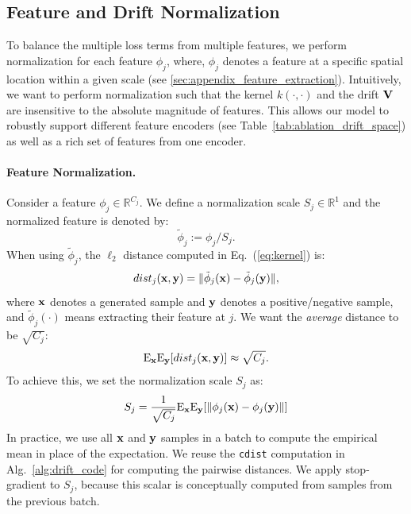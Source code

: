 \subsection{Feature and Drift Normalization}
\label{sec:appendix_feature_and_loss_normalization}

To balance the multiple loss terms from multiple features, we perform normalization for each feature $\phi_j$, where, $\phi_j$ denotes a feature at a specific spatial location within a given scale (see \ref{sec:appendix_feature_extraction}). 
Intuitively, we want to perform normalization such that the kernel $k(\cdot, \cdot)$ and the drift $\mathbf{V}$ are insensitive to the absolute magnitude of features.
This allows our model to robustly support different feature encoders (see Table~\ref{tab:ablation_drift_space}) as well as a rich set of features from one encoder.

\paragraph{Feature Normalization.} Consider a feature $\phi_j \in \mathbb{R}^{C_j}$. We define a normalization scale $S_j \in \mathbb{R}^{1}$ and the normalized feature is denoted by:
\begin{equation}
\tilde{\phi}_j := {\phi}_j / S_j.
\end{equation}
When using $\tilde{\phi}_j$, the $\ell_2$ distance computed in Eq.~(\ref{eq:kernel}) is:
\begin{equation}
dist_j(\mathbf{x}, \mathbf{y}) = \|\tilde{\phi}_j(\mathbf{x}) - \tilde{\phi}_j(\mathbf{y})\|,
\end{equation}
where $\mathbf{x}$ denotes a generated sample and $\mathbf{y}$ denotes a positive/negative sample, and $\tilde{\phi}_j(\cdot)$ means extracting their feature at $j$. We want the \textit{average} distance to be $\sqrt{C_j}$:
\begin{equation}
\mathrm{E}_{\mathbf{x}} \mathrm{E}_{\mathbf{y}} [ dist_j(\mathbf{x}, \mathbf{y})] \approx \sqrt{C_j}.
\end{equation}
To achieve this, we set the normalization scale $S_j$ as:
\begin{equation}
S_j = \frac{1}{\sqrt{C_j}} \mathrm{E}_{\mathbf{x}} \mathrm{E}_{\mathbf{y}} [ \|{\phi}_j(\mathbf{x}) - {\phi}_j(\mathbf{y})\| ]
\end{equation}
In practice, we use all $\mathbf{x}$ and $\mathbf{y}$ samples in a batch to compute the empirical mean in place of the expectation. We reuse the \texttt{cdist} computation in Alg.~\ref{alg:drift_code} for computing the pairwise distances. We apply stop-gradient to $S_j$, because this scalar is conceptually computed from samples from the previous batch.

